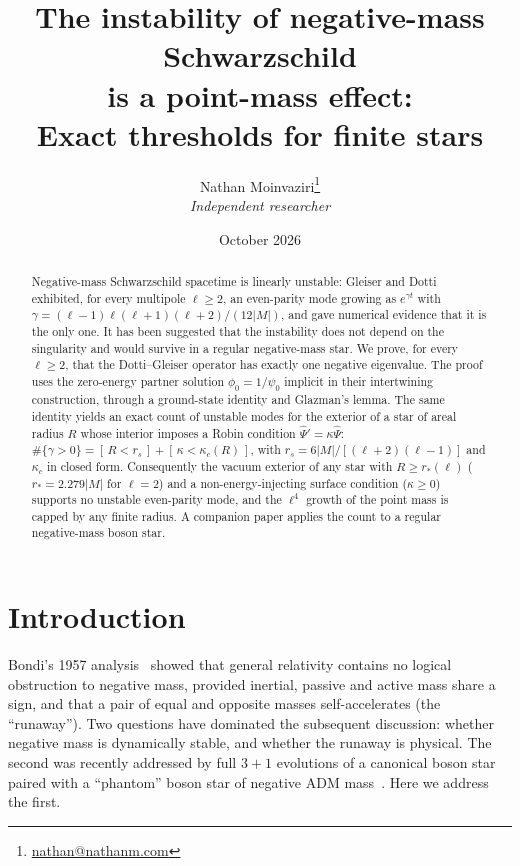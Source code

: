 \documentclass[11pt]{article}
\title{The instability of negative-mass Schwarzschild\\is a point-mass effect:\\[4pt]
\large Exact thresholds for finite stars}
\author{Nathan Moinvaziri\thanks{\href{mailto:nathan@nathanm.com}{nathan@nathanm.com}}\\[2pt]
\normalsize\textit{Independent researcher}}
\date{October 2026}
\theoremstyle{remark}
\newcommand{\Ind}[1]{[\,#1\,]}
\begin{document}
\maketitle

\begin{abstract}
Negative-mass Schwarzschild spacetime is linearly unstable: Gleiser and Dotti exhibited, for every multipole
$\ell\ge2$, an even-parity mode growing as $e^{\gamma t}$ with $\gamma=(\ell-1)\ell(\ell+1)(\ell+2)/(12|M|)$, and
gave numerical evidence that it is the only one. It has been suggested that the instability does not depend on the
singularity and would survive in a regular negative-mass star. We prove, for every $\ell\ge2$, that the
Dotti--Gleiser operator has exactly one negative eigenvalue. The proof uses the zero-energy partner solution
$\phi_0=1/\psi_0$ implicit in their intertwining construction, through a ground-state identity and Glazman's lemma.
The same identity yields an exact count of unstable modes for the exterior of a star of areal radius $R$ whose
interior imposes a Robin condition $\hat\Psi'=\kappa\hat\Psi$:
$\#\{\gamma>0\}=\Ind{R<r_s}+\Ind{\kappa<\kappa_c(R)}$, with $r_s=6|M|/[(\ell+2)(\ell-1)]$ and $\kappa_c$ in closed form.
Consequently the vacuum exterior of any star with $R\ge r_*(\ell)$ ($r_*=2.279|M|$ for $\ell=2$) and a
non-energy-injecting surface condition ($\kappa\ge0$) supports no unstable even-parity mode, and the $\ell^4$ growth
of the point mass is capped by any finite radius. A companion paper applies the count to a regular negative-mass boson star.
\end{abstract}

\tableofcontents

\section{Introduction}

Bondi's 1957 analysis~\cite{Bondi1957} showed that general relativity contains no logical obstruction to negative
mass, provided inertial, passive and active mass share a sign, and that a pair of equal and opposite masses
self-accelerates (the ``runaway''). Two questions have dominated the subsequent discussion: whether negative mass is
dynamically stable, and whether the runaway is physical. The second was recently addressed by full $3+1$ evolutions of a
canonical boson star paired with a ``phantom'' boson star of negative ADM mass~\cite{Shirokov2026}. Here we address the
first.
\end{document}
